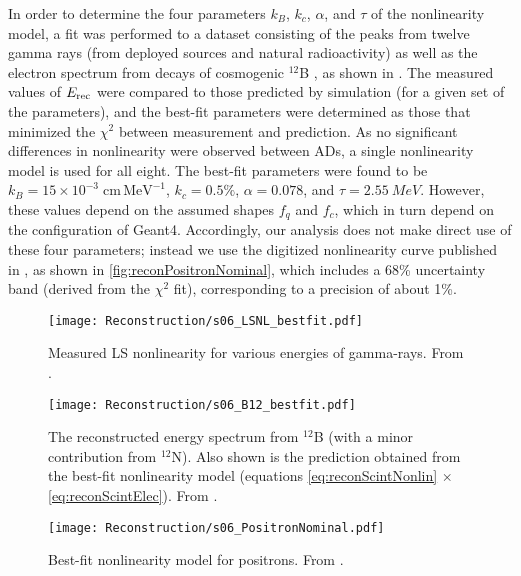 \documentclass[../thesis.tex]{subfiles}
\begin{document}
In order to determine the four parameters $k_B$, $k_c$, $\alpha$, and $\tau$ of the nonlinearity model, a fit was performed to a dataset consisting of the peaks from twelve gamma rays (from deployed sources and natural radioactivity) as well as the electron spectrum from decays of cosmogenic $^{12}$B \cite{NonlinearityPaper}, as shown in . The measured values of $E_\mathrm{rec}$ were compared to those predicted by simulation (for a given set of the parameters), and the best-fit parameters were determined as those that minimized the $\chi^2$ between measurement and prediction. As no significant differences in nonlinearity were observed between ADs, a single nonlinearity model is used for all eight. The best-fit parameters were found to be $k_B = 15 \times 10^{-3}\;\mathrm{cm\, MeV^{-1}}$, $k_c = 0.5\%$, $\alpha = 0.078$, and $\tau = \SI{2.55}{MeV}$. However, these values depend on the assumed shapes $f_q$ and $f_c$, which in turn depend on the configuration of Geant4. Accordingly, our analysis does not make direct use of these four parameters; instead we use the digitized nonlinearity curve published in \cite{NonlinearityPaper}, as shown in \autoref{fig:reconPositronNominal}, which includes a 68\% uncertainty band (derived from the $\chi^2$ fit), corresponding to a precision of about 1\%.

\begin{figure}[h]
  \texttt{[image: Reconstruction/s06\_LSNL\_bestfit.pdf]}
  \caption{Measured LS nonlinearity for various energies of gamma-rays. From \cite{NonlinearityPaper}.}
  \label{fig:reconGammaLines}
\end{figure}

\begin{figure}[h]
  \texttt{[image: Reconstruction/s06\_B12\_bestfit.pdf]}
  \caption{The reconstructed energy spectrum from $^{12}$B (with a minor contribution from $^{12}$N). Also shown is the prediction obtained from the best-fit nonlinearity model (equations \autoref{eq:reconScintNonlin} $\times$ \autoref{eq:reconScintElec}). From \cite{NonlinearityPaper}.}
  \label{fig:reconB12}
\end{figure}

\begin{figure}[h]
  \texttt{[image: Reconstruction/s06\_PositronNominal.pdf]}
  \caption{Best-fit nonlinearity model for positrons. From \cite{NonlinearityPaper}.}
  \label{fig:reconPositronNominal}
\end{figure}
\end{document}
